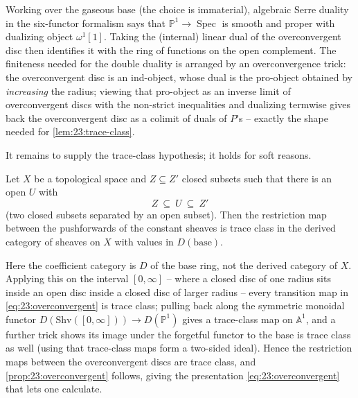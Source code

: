\begin{remark}
\label{rmk:23:serre-duality}
Working over the gaseous base (the choice is immaterial), algebraic Serre duality
in the six-functor formalism says that $\mathbb P^1\to\operatorname{Spec}$ is
smooth and proper with dualizing object $\omega^1[1]$. Taking the (internal)
linear dual of the overconvergent disc then identifies it with the ring of
functions on the open complement. The finiteness needed for the double duality
is arranged by an overconvergence trick: the overconvergent disc is an
ind-object, whose dual is the pro-object obtained by \emph{increasing} the
radius; viewing that pro-object as an inverse limit of overconvergent discs with
the non-strict inequalities and dualizing termwise gives back the
overconvergent disc as a colimit of duals of $P$'s -- exactly the shape needed
for \cref{lem:23:trace-class}.
\end{remark}

It remains to supply the trace-class hypothesis; it holds for soft reasons.

\begin{lemma}
\label{lem:23:trace-class-topology}
Let $X$ be a topological space and $Z\subseteq Z'$ closed subsets such that
there is an open $U$ with
\begin{equation*}
Z\ \subseteq\ U\ \subseteq\ Z'
\end{equation*}
(two closed subsets separated by an open subset). Then the restriction map
between the pushforwards of the constant sheaves is trace class in the derived
category of sheaves on $X$ with values in $D(\text{base})$.
\end{lemma}

Here the coefficient category is $D$ of the base ring, not the derived category
of $X$. Applying this on the interval $[0,\infty]$ -- where a closed disc of one
radius sits inside an open disc inside a closed disc of larger radius -- every
transition map in \eqref{eq:23:overconvergent} is trace class; pulling back along
the symmetric monoidal functor $D(\mathrm{Shv}([0,\infty]))\to D(\mathbb P^1)$
gives a trace-class map on $\mathbb A^1$, and a further trick shows its image
under the forgetful functor to the base is trace class as well (using that
trace-class maps form a two-sided ideal). Hence the restriction maps between the
overconvergent discs are trace class, and \cref{prop:23:overconvergent} follows,
giving the presentation \eqref{eq:23:overconvergent} that lets one calculate.

